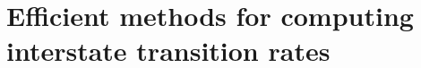 \chapter{Efficient methods for computing interstate transition rates}
\label{chapter:efficient-computation-of-transition-rates}

